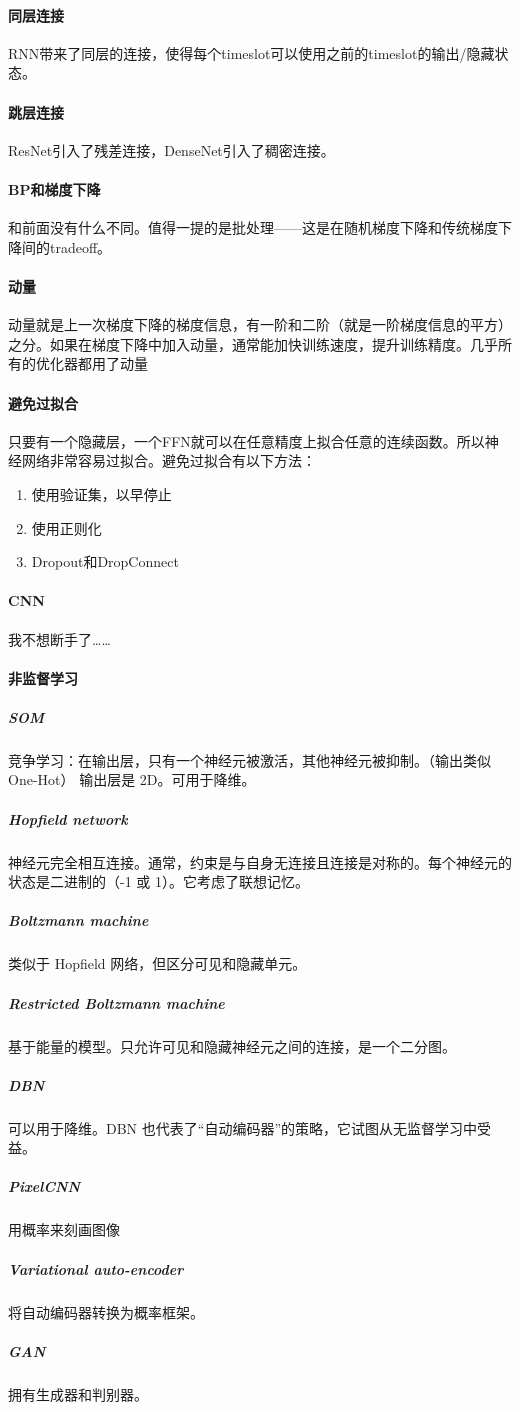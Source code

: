 \paragraph{同层连接}
RNN带来了同层的连接，使得每个timeslot可以使用之前的timeslot的输出/隐藏状态。

\paragraph{跳层连接}
ResNet引入了残差连接，DenseNet引入了稠密连接。

\paragraph{BP和梯度下降}
和前面没有什么不同。值得一提的是批处理——这是在随机梯度下降和传统梯度下降间的tradeoff。

\paragraph{动量}
动量就是上一次梯度下降的梯度信息，有一阶和二阶（就是一阶梯度信息的平方）之分。如果在梯度下降中加入动量，通常能加快训练速度，提升训练精度。几乎所有的优化器都用了动量

\paragraph{避免过拟合} 只要有一个隐藏层，一个FFN就可以在任意精度上拟合任意的连续函数。所以神经网络非常容易过拟合。避免过拟合有以下方法：
\begin{enumerate}
\item 使用验证集，以早停止
\item 使用正则化
\item Dropout和DropConnect
\end{enumerate}

\paragraph{CNN}
我不想断手了……

\paragraph{非监督学习}
\subparagraph{SOM}
竞争学习：在输出层，只有一个神经元被激活，其他神经元被抑制。（输出类似One-Hot）
输出层是 2D。可用于降维。 
\subparagraph{Hopfield network}
神经元完全相互连接。通常，约束是与自身无连接且连接是对称的。每个神经元的状态是二进制的（-1 或 1）。它考虑了联想记忆。
\subparagraph{Boltzmann machine}
类似于 Hopfield 网络，但区分可见和隐藏单元。
\subparagraph{Restricted Boltzmann machine}
基于能量的模型。只允许可见和隐藏神经元之间的连接，是一个二分图。
\subparagraph{DBN}
可以用于降维。DBN 也代表了“自动编码器”的策略，它试图从无监督学习中受益。
\subparagraph{PixelCNN}
用概率来刻画图像
\subparagraph{Variational auto-encoder}
将自动编码器转换为概率框架。
\subparagraph{GAN}
拥有生成器和判别器。